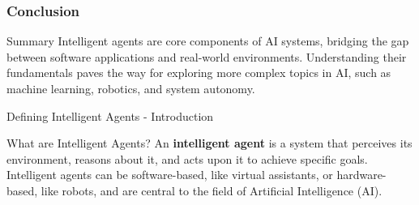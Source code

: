 \documentclass[aspectratio=169]{beamer}
\begin{document}
\begin{frame}[fragile]
    \frametitle{Conclusion}
    \begin{block}{Summary}
        Intelligent agents are core components of AI systems, bridging the gap between software applications and real-world environments. Understanding their fundamentals paves the way for exploring more complex topics in AI, such as machine learning, robotics, and system autonomy.
    \end{block}
\end{frame}

\begin{frame}[fragile]{Defining Intelligent Agents - Introduction}
    \begin{block}{What are Intelligent Agents?}
        An \textbf{intelligent agent} is a system that perceives its environment, reasons about it, and acts upon it to achieve specific goals. 
        Intelligent agents can be software-based, like virtual assistants, or hardware-based, like robots, and are central to the field of Artificial Intelligence (AI).
    \end{block}
\end{frame}
\end{document}
